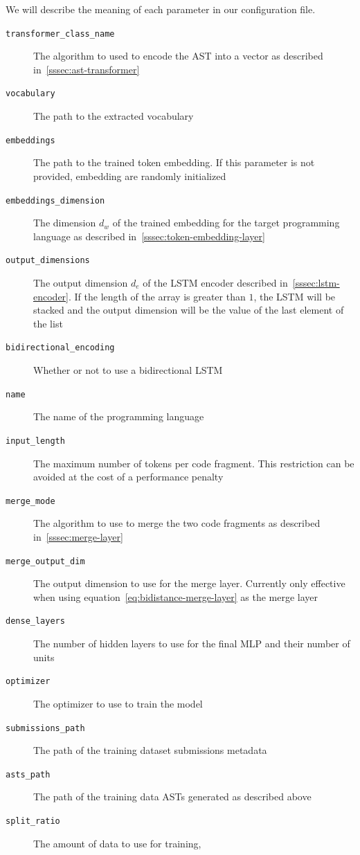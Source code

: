 We will describe the meaning of each parameter in our configuration file.

\begin{description}
\item[{\small\texttt{transformer\_class\_name}}] The algorithm to used to encode
  the AST into a vector as described in~\ref{sssec:ast-transformer}
\item[{\small\texttt{vocabulary}}] The path to the extracted vocabulary
\item[{\small\texttt{embeddings}}] The path to the trained token embedding. If
  this parameter is not provided, embedding are randomly initialized
\item[{\small\texttt{embeddings\_dimension}}] The dimension $d_w$ of the trained embedding
  for the target programming language as described in~\ref{sssec:token-embedding-layer}
\item[{\small\texttt{output\_dimensions}}] The output dimension $d_e$ of the
  LSTM encoder described in~\ref{sssec:lstm-encoder}. If the length of the array
  is greater than $1$, the LSTM will be stacked and the output dimension will be
  the value of the last element of the list
\item[{\small\texttt{bidirectional\_encoding}}] Whether or not to use a
  bidirectional LSTM
\item[{\small\texttt{name}}] The name of the programming language
\item[{\small\texttt{input\_length}}] The maximum number of tokens per code
  fragment. This restriction can be avoided at the cost of a performance penalty
\item[{\small\texttt{merge\_mode}}] The algorithm to use to merge the two code
  fragments as described in~\ref{sssec:merge-layer}
\item[{\small\texttt{merge\_output\_dim}}]The output dimension to use for the merge layer. Currently only effective
  when using equation~\ref{eq:bidistance-merge-layer} as the merge layer
\item[{\small\texttt{dense\_layers}}] The number of hidden layers to use for the
  final MLP and their number of units
\item[{\small\texttt{optimizer}}] The optimizer to use to train the model
\item[{\small\texttt{submissions\_path}}]The path of the training dataset
  submissions metadata
\item[{\small\texttt{asts\_path}}] The path of the training data ASTs generated
  as described above
\item[{\small\texttt{split\_ratio}}] The amount of data to use for training,

\end{description}
